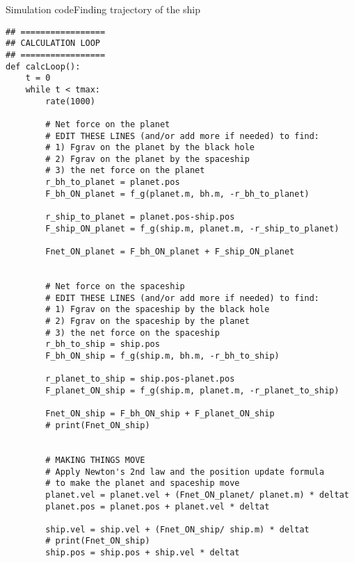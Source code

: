 \begin{frame}[fragile]{Simulation code}{Finding trajectory of the ship}
\begin{multicols}{2}
\begin{verbatim}
## =================
## CALCULATION LOOP
## =================
def calcLoop():
    t = 0
    while t < tmax:
        rate(1000)
    
        # Net force on the planet
        # EDIT THESE LINES (and/or add more if needed) to find:
        # 1) Fgrav on the planet by the black hole
        # 2) Fgrav on the planet by the spaceship
        # 3) the net force on the planet
        r_bh_to_planet = planet.pos
        F_bh_ON_planet = f_g(planet.m, bh.m, -r_bh_to_planet)
        
        r_ship_to_planet = planet.pos-ship.pos
        F_ship_ON_planet = f_g(ship.m, planet.m, -r_ship_to_planet)
        
        Fnet_ON_planet = F_bh_ON_planet + F_ship_ON_planet
        
        
        # Net force on the spaceship
        # EDIT THESE LINES (and/or add more if needed) to find:
        # 1) Fgrav on the spaceship by the black hole
        # 2) Fgrav on the spaceship by the planet
        # 3) the net force on the spaceship
        r_bh_to_ship = ship.pos
        F_bh_ON_ship = f_g(ship.m, bh.m, -r_bh_to_ship)
        
        r_planet_to_ship = ship.pos-planet.pos
        F_planet_ON_ship = f_g(ship.m, planet.m, -r_planet_to_ship)
    
        Fnet_ON_ship = F_bh_ON_ship + F_planet_ON_ship
        # print(Fnet_ON_ship)
    
    
        # MAKING THINGS MOVE   
        # Apply Newton's 2nd law and the position update formula 
        # to make the planet and spaceship move
        planet.vel = planet.vel + (Fnet_ON_planet/ planet.m) * deltat
        planet.pos = planet.pos + planet.vel * deltat
    
        ship.vel = ship.vel + (Fnet_ON_ship/ ship.m) * deltat
        # print(Fnet_ON_ship)
        ship.pos = ship.pos + ship.vel * deltat
\end{verbatim}
\end{multicols}
\end{frame}

